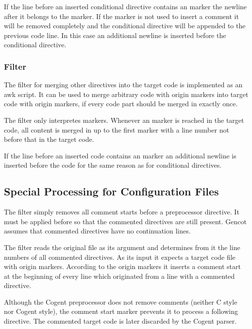 If the line before an inserted conditional directive contains an  marker the newline after it belongs
to the marker. If the marker is not used to insert a comment it will be removed completely and the conditional
directive will be appended to the previous code line. In this case an additional newline is inserted before 
the conditional directive.

\subsubsection{Filter }

The filter for merging other directives into the target code is implemented as an awk script. It can be used to 
merge arbitrary code with origin markers into target code with origin markers, if every code part should be
merged in exactly once.

The filter only interpretes  markers. Whenever an  marker is reached in the target
code, all content is merged in up to the first  marker with a line number not before that in the target
code.

If the line before an inserted code contains an  marker an additional newline is inserted before 
the code for the same reason as for conditional directives.

\subsection{Special Processing for Configuration Files}

The filter  simply removes all \code{//} comment starts before a preprocessor directive.
It must be applied before  so that the commented directives are still present. Gencot 
assumes that commented directives have no continuation lines.

The filter  reads the original file as its argument and determines from it the
line numbers of all commented directives. As its input it expects a target code file with origin markers.
According to the origin markers it inserts a \code{-{}-} comment start at the beginning of every line which
originated from a line with a commented directive. 

Although the Cogent preprocessor does not remove comments (neither C style nor Cogent style), the comment start
marker prevents it to process a following directive. The commented target code is later discarded by the Cogent 
parser.
